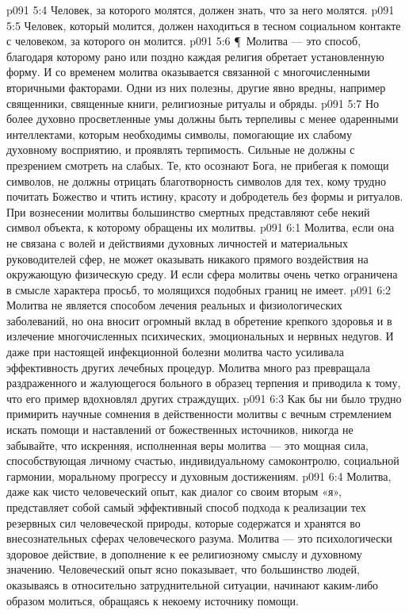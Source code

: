 \vs p091 5:4 \bibnobreakspace Человек, за которого молятся, должен знать, что за него молятся.
\vs p091 5:5 \bibnobreakspace Человек, который молится, должен находиться в тесном социальном контакте с человеком, за которого он молится.
\vs p091 5:6 \P\ Молитва --- это способ, благодаря которому рано или поздно каждая религия обретает установленную форму. И со временем молитва оказывается связанной с многочисленными вторичными факторами. Одни из них полезны, другие явно вредны, например священники, священные книги, религиозные ритуалы и обряды.
\vs p091 5:7 Но более духовно просветленные умы должны быть терпеливы с менее одаренными интеллектами, которым необходимы символы, помогающие их слабому духовному восприятию, и проявлять терпимость. Сильные не должны с презрением смотреть на слабых. Те, кто осознают Бога, не прибегая к помощи символов, не должны отрицать благотворность символов для тех, кому трудно почитать Божество и чтить истину, красоту и добродетель без формы и ритуалов. При вознесении молитвы большинство смертных представляют себе некий символ объекта, к которому обращены их молитвы.
\vs p091 6:1 Молитва, если она не связана с волей и действиями духовных личностей и материальных руководителей сфер, не может оказывать никакого прямого воздействия на окружающую физическую среду. И если сфера молитвы очень четко ограничена в смысле характера просьб, то  молящихся подобных границ не имеет.
\vs p091 6:2 Молитва не является способом лечения реальных и физиологических заболеваний, но она вносит огромный вклад в обретение крепкого здоровья и в излечение многочисленных психических, эмоциональных и нервных недугов. И даже при настоящей инфекционной болезни молитва часто усиливала эффективность других лечебных процедур. Молитва много раз превращала раздраженного и жалующегося больного в образец терпения и приводила к тому, что его пример вдохновлял других страждущих.
\vs p091 6:3 Как бы ни было трудно примирить научные сомнения в действенности молитвы с вечным стремлением искать помощи и наставлений от божественных источников, никогда не забывайте, что искренняя, исполненная веры молитва --- это мощная сила, способствующая личному счастью, индивидуальному самоконтролю, социальной гармонии, моральному прогрессу и духовным достижениям.
\vs p091 6:4 Молитва, даже как чисто человеческий опыт, как диалог со своим вторым «я», представляет собой самый эффективный способ подхода к реализации тех резервных сил человеческой природы, которые содержатся и хранятся во внесознательных сферах человеческого разума. Молитва --- это психологически здоровое действие, в дополнение к ее религиозному смыслу и духовному значению. Человеческий опыт ясно показывает, что большинство людей, оказываясь в относительно затруднительной ситуации, начинают каким\hyp{}либо образом молиться, обращаясь к некоему источнику помощи.
